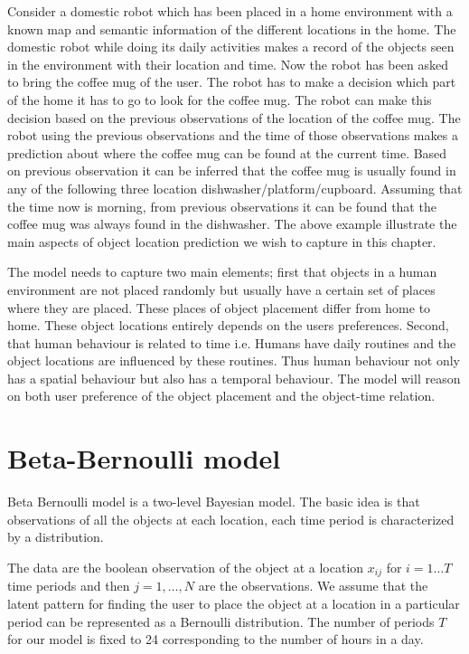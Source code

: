Consider a domestic robot which has been placed in a home environment with a known map
and semantic information of the different locations in the home. The domestic robot while doing its daily activities 
makes a record of the objects seen in the environment with
their location and time. Now the robot has been asked to bring the coffee mug
of the user.
The robot has to make a decision which part of the home it has to go to look for
the coffee mug.
The robot can make this decision based on the previous observations of the 
location of the coffee mug.
The robot using the previous observations and the time of those observations 
makes a prediction about where the coffee mug can be found at the current time.
Based on previous observation it can be
inferred that the coffee mug is usually found in any of the following three location
dishwasher/platform/cupboard. Assuming that the time now is morning, from
previous observations it can be found that the coffee mug was always found  in the
dishwasher. The above example illustrate the main aspects of object location
prediction we wish to capture in this chapter.


The model needs to capture two main
elements; first that objects in a human environment are not placed randomly but
usually have a certain set of places where they are placed.
These places of object placement differ from home
to home. These object locations entirely depends on the users preferences.  
Second, that human behaviour is related to time i.e. Humans have daily routines  and the object locations are influenced by these routines.
Thus human behaviour not only  has a spatial behaviour but also has a temporal behaviour.
The model will reason on both user preference of the object placement and the
object-time relation.

\section{Beta-Bernoulli model}


Beta Bernoulli model is a two-level Bayesian model. The basic idea is that observations of all the objects at each location, each time period is characterized by a distribution.

The data are the boolean observation of the object at a location $x_{ij}$ for $i = 1 \dots T$ time periods and then $j = 1, \dots , N$  are the observations.  We assume that the latent pattern for finding the user to place the object at a  location in a particular period can be represented as a Bernoulli distribution. The number of periods $T$ for our model is fixed to 24 corresponding to the number of hours in a day. 

